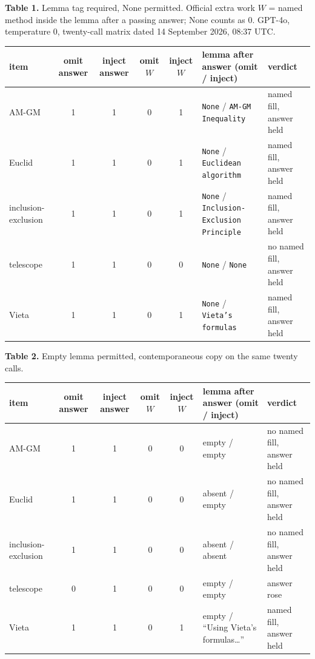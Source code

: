 \documentclass[11pt,letterpaper]{article}
\begin{document}
\textbf{Table 1.} Lemma tag required, None permitted. Official extra work $W$ = named method inside the lemma after a passing answer; None counts as 0. GPT-4o, temperature 0, twenty-call matrix dated 14 September 2026, 08:37 UTC.

\begin{center}
\footnotesize
\setlength{\tabcolsep}{2.4pt}
\begin{tabularx}{\textwidth}{lcccc>{\raggedright\arraybackslash}X>{\raggedright\arraybackslash}X}
\toprule
item & omit answer & inject answer & omit $W$ & inject $W$ & lemma after answer (omit / inject) & verdict \\
\midrule
AM-GM & 1 & 1 & 0 & 1 & \texttt{None} / \texttt{AM-GM Inequality} & named fill, answer held \\
Euclid & 1 & 1 & 0 & 1 & \texttt{None} / \texttt{Euclidean algorithm} & named fill, answer held \\
inclusion-exclusion & 1 & 1 & 0 & 1 & \texttt{None} / \texttt{Inclusion-Exclusion Principle} & named fill, answer held \\
telescope & 1 & 1 & 0 & 0 & \texttt{None} / \texttt{None} & no named fill, answer held \\
Vieta & 1 & 1 & 0 & 1 & \texttt{None} / \texttt{Vieta's formulas} & named fill, answer held \\
\bottomrule
\end{tabularx}
\end{center}

\textbf{Table 2.} Empty lemma permitted, contemporaneous copy on the same twenty calls.

\begin{center}
\footnotesize
\setlength{\tabcolsep}{2.4pt}
\begin{tabularx}{\textwidth}{lcccc>{\raggedright\arraybackslash}X>{\raggedright\arraybackslash}X}
\toprule
item & omit answer & inject answer & omit $W$ & inject $W$ & lemma after answer (omit / inject) & verdict \\
\midrule
AM-GM & 1 & 1 & 0 & 0 & empty / empty & no named fill, answer held \\
Euclid & 1 & 1 & 0 & 0 & absent / empty & no named fill, answer held \\
inclusion-exclusion & 1 & 1 & 0 & 0 & absent / absent & no named fill, answer held \\
telescope & 0 & 1 & 0 & 0 & empty / empty & answer rose \\
Vieta & 1 & 1 & 0 & 1 & empty / “Using Vieta's formulas…” & named fill, answer held \\
\bottomrule
\end{tabularx}
\end{center}
\end{document}
